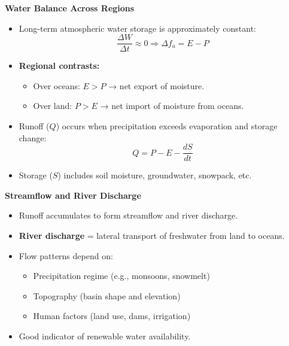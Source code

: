\documentclass[fontsize=8pt, a4paper, landscape, fleqn]{scrartcl}
\renewcommand{\subsection}[1]{%
    \noindent\colorbox{subsectioncolor}{%
        \parbox{\dimexpr\columnwidth-2\fboxsep}{\color{white}\textbf{#1}}}%
    \vspace{0.5mm}%
}
\begin{document}
\begin{multicols*}{3}[\raggedcolumns]
\subsection{Water Balance Across Regions}
\begin{itemize}
    \item Long-term atmospheric water storage is approximately constant:
    \[
    \frac{\Delta W}{\Delta t} \approx 0 \Rightarrow \Delta f_a = E - P
    \]
    \item \textbf{Regional contrasts:}
    \begin{itemize}
        \item Over oceans: $E > P$ → net export of moisture.
        \item Over land: $P > E$ → net import of moisture from oceans.
    \end{itemize}
    \item Runoff ($Q$) occurs when precipitation exceeds evaporation and storage change:
    \[
    Q = P - E - \frac{dS}{dt}
    \]
    \item Storage ($S$) includes soil moisture, groundwater, snowpack, etc.
\end{itemize}

\subsection{Streamflow and River Discharge}
\begin{itemize}
    \item Runoff accumulates to form streamflow and river discharge.
    \item \textbf{River discharge} = lateral transport of freshwater from land to oceans.
    \item Flow patterns depend on:
    \begin{itemize}
        \item Precipitation regime (e.g., monsoons, snowmelt)
        \item Topography (basin shape and elevation)
        \item Human factors (land use, dams, irrigation)
    \end{itemize}
    \item Good indicator of renewable water availability.
\end{itemize}


\end{multicols*}
\end{document}
